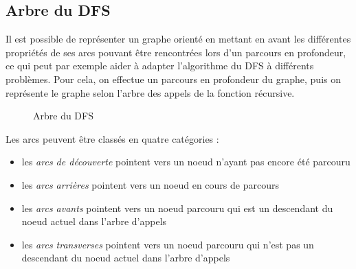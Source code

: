\documentclass[11pt,a4paper]{article}
\begin{document}
  \subsection{Arbre du DFS}
Il est possible de représenter un graphe orienté en mettant en avant les différentes propriétés de ses arcs pouvant être rencontrées lors d'un parcours en profondeur, ce qui peut par exemple aider à adapter l'algorithme du DFS à différents problèmes.
Pour cela, on effectue un parcours en profondeur du graphe, puis on représente le graphe selon l'arbre des appels de la fonction récursive.

\begin{figure}[h]
  \label{arbre-dfs}
  \centering
  \caption{Arbre du DFS}
\end{figure}

Les arcs peuvent être classés en quatre catégories :
\begin{itemize}
  \item[\LARGE\textbf\textrightarrow] les \textit{arcs de découverte} pointent vers un noeud n'ayant pas encore été parcouru
  \item[\color{red} \LARGE\textbf\textrightarrow] les \textit{arcs arrières} pointent vers un noeud en cours de parcours
  \item[\color{green} \LARGE\textbf\textrightarrow] les \textit{arcs avants} pointent vers un noeud parcouru qui est un descendant du noeud actuel dans l'arbre d'appels
  \item[\color{blue} \LARGE\textbf\textrightarrow] les \textit{arcs transverses} pointent vers un noeud parcouru qui n'est pas un descendant du noeud actuel dans l'arbre d'appels
\end{itemize}
\end{document}
